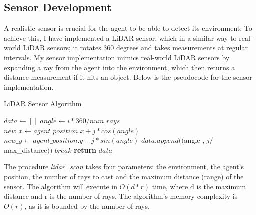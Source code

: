 \documentclass[12pt]{article}
\begin{document}
\subsection{Sensor Development}
A realistic sensor is crucial for the agent to be able to detect its environment. To achieve this, I have implemented a LiDAR sensor,
which in a similar way to real-world LiDAR sensors; it rotates 360 degrees and takes measurements at regular intervals. My sensor
implementation mimics real-world LiDAR sensors by expanding a ray from the agent into the environment, which then returns a distance
measurement if it hits an object. Below is the pseudocode for the sensor implementation.\\
\begin{algorithm}[H]
    \caption{LiDAR Sensor Algorithm}\label{alg:lidar_sensor}
    \begin{algorithmic}
            \State $data \gets []$
                \State $angle \gets i * 360 / num\_rays$
                    \State $new\_x \gets agent\_position.x + j * cos(angle)$
                    \State $new\_y \gets agent\_position.y + j * sin(angle)$
                        \State $data.append(($angle , $j / $max\_distance$))$
                        \State $break$
                    \EndIf
                \EndFor
            \EndFor
            \State \textbf{return} $data$
        \EndFunction{}
    \end{algorithmic}
\end{algorithm}
The procedure \textit{lidar\_scan} takes four parameters: the environment, the agent's position, the number of rays to cast and the
maximum distance (range) of the sensor. The algorithm will execute in \(O(d * r)\) time, where d is the maximum distance and r is
the number of rays. The algorithm's memory complexity is \(O(r)\), as it is bounded by the
number of rays.\\
\end{document}
